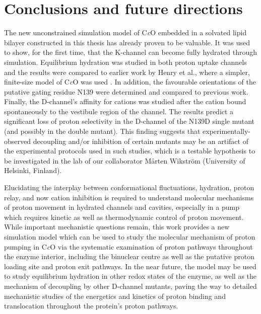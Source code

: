 \chapter{Conclusions and future directions}

The new unconstrained simulation model of C\emph{c}O embedded in a solvated lipid bilayer constructed in this thesis has already proven to be valuable. It was used to show, for the first time, that the K-channel can become fully hydrated through simulation. Equilibrium hydration was studied in both proton uptake channels and the results were compared to earlier work by Henry et al., where a simpler, finite-size model of C\emph{c}O was used \cite{Henry:2011p10221}. In addition, the favourable orientations of the putative gating residue N139 were determined and compared to previous work. Finally, the D-channel's affinity for  cations was studied after the cation bound spontaneously to the vestibule region of the channel. The results predict a significant loss of proton selectivity in the D-channel of the N139D single mutant (and possibly in the double mutant). This finding suggests that experimentally-observed decoupling and/or inhibition of certain mutants may be an artifact of the experimental protocols used in such studies, which is a testable hypothesis to be investigated in the lab of our collaborator Mårten Wikström (University of Helsinki, Finland).

Elucidating the interplay between conformational fluctuations, hydration, proton relay, and now cation inhibition is required to understand molecular mechanisms of proton movement in hydrated channels and cavities, especially in a pump which requires kinetic as well as thermodynamic control of proton movement. While important mechanistic questions remain, this work provides a new simulation model which can be used to study the molecular mechanism of proton pumping in C\emph{c}O via the systematic examination of proton pathways throughout the enzyme interior, including the binuclear centre as well as the putative proton loading site and proton exit pathways. In the near future, the model may be used to study equilibrium hydration in other redox states of the enzyme, as well as the mechanism of decoupling by other D-channel mutants, paving the way to detailed mechanistic studies of the energetics and kinetics of proton binding and translocation throughout the protein's proton pathways.
